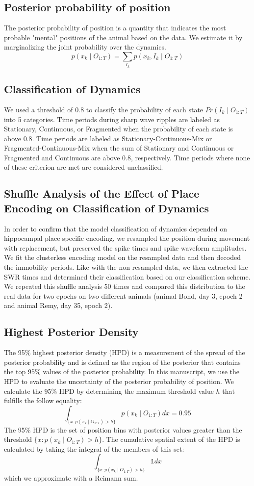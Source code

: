 \documentclass[times, twoside]{zHenriquesLab-StyleBioRxiv}
\begin{document}
\subsection*{Posterior probability of position}
The posterior probability of position is a quantity that indicates the most probable "mental" positions of the animal based on the data. We estimate it by marginalizing the joint probability over the dynamics.
$$p(x_{k} \mid O_{1:T}) = \sum_{I_{k}} p(x_{k}, I_{k} \mid O_{1:T})$$

\subsection*{Classification of Dynamics}
We used a threshold of 0.8 to classify the probability of each state $Pr(I_{k} \mid O_{1:T})$ into 5 categories. Time periods during sharp wave ripples are labeled as Stationary, Continuous, or Fragmented when the probability of each state is above 0.8. Time periods are labeled as Stationary-Continuous-Mix or Fragmented-Continuous-Mix when the sum of Stationary and Continuous or Fragmented and Continuous are above 0.8, respectively. Time periods where none of these criterion are met are considered unclassified.

\subsection*{Shuffle Analysis of the Effect of Place Encoding on Classification of Dynamics}
In order to confirm that the model classification of dynamics depended on hippocampal place specific encoding, we resampled the position during movement with replacement, but preserved the spike times and spike waveform amplitudes. We fit the clusterless encoding model on the resampled data and then decoded the immobility periods. Like with the non-resampled data, we then extracted the SWR times and determined their classification based on our classification scheme. We repeated this shuffle analysis 50 times and compared this distribution to the real data for two epochs on two different animals (animal Bond, day 3, epoch 2 and animal Remy, day 35, epoch 2).

\subsection*{Highest Posterior Density}
The 95\% highest posterior density (HPD) is a measurement of the spread of the posterior probability and is defined as the region of the posterior that contains the top 95\% values of the posterior probability. In this manuscript, we use the HPD to evaluate the uncertainty of the posterior probability of position. We calculate the 95\% HPD by determining the maximum threshold value $h$ that fulfills the follow equality:
$$
\int_{\{x: p(x_{k} \mid O_{1:T}) > h\}} p(x_{k} \mid O_{1:T})dx = 0.95
$$
The 95\% HPD is the set of position bins with posterior values greater than the threshold $\{x : p(x_{k} \mid O_{1:T}) > h\}$. The cumulative spatial extent of the HPD is calculated by taking the integral of the members of this set:
$$
\int_{\{x: p(x_{k} \mid O_{1:T}) > h\}} \mathbb{1}dx
$$
which we approximate with a Reimann sum.
\end{document}
